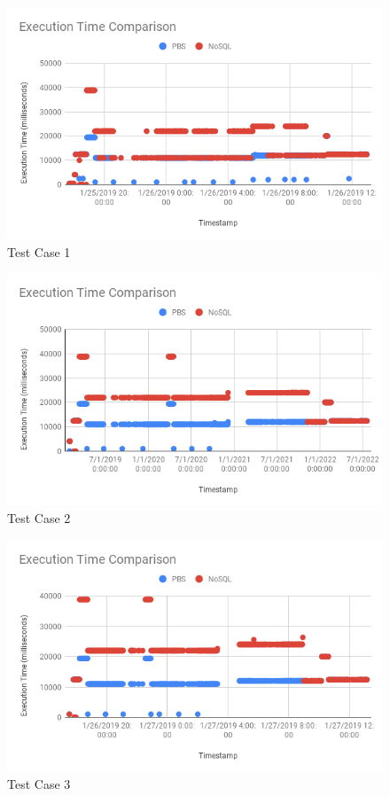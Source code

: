 \begin{figure}
\centering
\includegraphics[scale=0.70]{images/ETC_TC1.png}
\caption{Test Case 1}
\label{fig:etc_tc1}
\end{figure}

\begin{figure}
\centering
\includegraphics[scale=0.70]{images/ETC_TC2.png}
\caption{Test Case 2}
\label{fig:etc_tc2}
\end{figure}

\begin{figure}
\centering
\includegraphics[scale=0.70]{images/ETC_TC3.png}
\caption{Test Case 3}
\label{fig:etc_tc3}
\end{figure}

